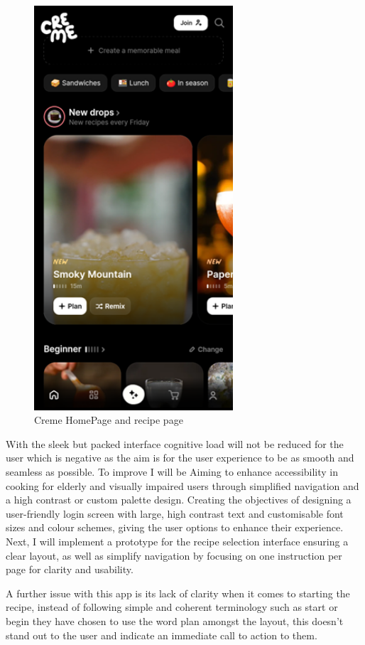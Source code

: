 \documentclass[]{project_interim}
\begin{document}
\begin{figure}[ht!]
\begin{minipage}[t]{0.4\textwidth}
    \includegraphics[width=20em]{cremeImage2.png}
  \end{minipage}
  \caption{Creme HomePage and recipe page}
  \label{fig:1}
\end{figure}

With the sleek but packed interface cognitive load will not be reduced for the user which is negative as the aim is for the user experience to be as smooth and seamless as possible.
To improve I will be Aiming to enhance accessibility in cooking for elderly and visually impaired users through simplified navigation and a high contrast or custom palette design. Creating the objectives of designing a user-friendly login screen with large, high contrast text and customisable font sizes and colour schemes, giving the user options to enhance their experience. Next, I will implement a prototype for the recipe selection interface ensuring a clear layout, as well as simplify navigation by focusing on one instruction per page for clarity and usability.

A further issue with this app is its lack of clarity when it comes to starting the recipe, instead of following simple and coherent terminology such as start or begin they have chosen to use the word plan amongst the layout, this doesn’t stand out to the user and indicate an immediate call to action to them.
\end{document}
